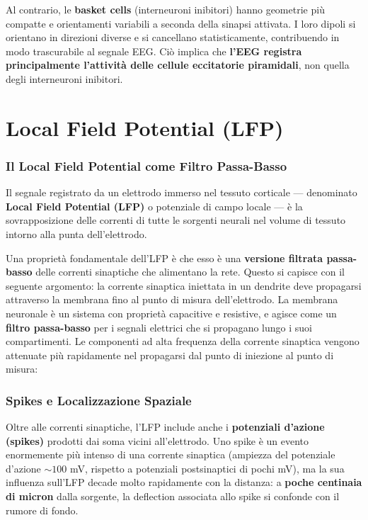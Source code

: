 Al contrario, le \textbf{basket cells} (interneuroni inibitori) hanno geometrie più compatte e orientamenti variabili a seconda della sinapsi attivata. I loro dipoli si orientano in direzioni diverse e si cancellano statisticamente, contribuendo in modo trascurabile al segnale EEG. Ciò implica che \textbf{l'EEG registra principalmente l'attività delle cellule eccitatorie piramidali}, non quella degli interneuroni inibitori.



\section{Local Field Potential (LFP)}

\subsubsection{Il Local Field Potential come Filtro Passa-Basso}

Il segnale registrato da un elettrodo immerso nel tessuto corticale — denominato \textbf{Local Field Potential (LFP)} o potenziale di campo locale — è la sovrapposizione delle correnti di tutte le sorgenti neurali nel volume di tessuto intorno alla punta dell'elettrodo.

Una proprietà fondamentale dell'LFP è che esso è una \textbf{versione filtrata passa-basso} delle correnti sinaptiche che alimentano la rete. Questo si capisce con il seguente argomento: la corrente sinaptica iniettata in un dendrite deve propagarsi attraverso la membrana fino al punto di misura dell'elettrodo. La membrana neuronale è un sistema con proprietà capacitive e resistive, e agisce come un \textbf{filtro passa-basso} per i segnali elettrici che si propagano lungo i suoi compartimenti. Le componenti ad alta frequenza della corrente sinaptica vengono attenuate più rapidamente nel propagarsi dal punto di iniezione al punto di misura:



\subsubsection{Spikes e Localizzazione Spaziale}

Oltre alle correnti sinaptiche, l'LFP include anche i \textbf{potenziali d'azione (spikes)} prodotti dai soma vicini all'elettrodo. Uno spike è un evento enormemente più intenso di una corrente sinaptica (ampiezza del potenziale d'azione $\sim 100$ mV, rispetto a potenziali postsinaptici di pochi mV), ma la sua influenza sull'LFP decade molto rapidamente con la distanza: a \textbf{poche centinaia di micron} dalla sorgente, la deflection associata allo spike si confonde con il rumore di fondo.

